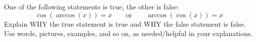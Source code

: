 \documentclass[noauthor,nooutcomes,12pt]{ximera}
\begin{document}
\begin{question}
  One of the following statements is true, the other is false:
  \[
  \cos(\arccos(x)) = x \qquad \text{or} \qquad \arccos(\cos(x)) =x
  \]
  Explain WHY the true statement is true and WHY the false statement
  is false.  Use words, pictures, examples, and so on, as
  needed/helpful in your explanations.
\end{question}
\end{document}
